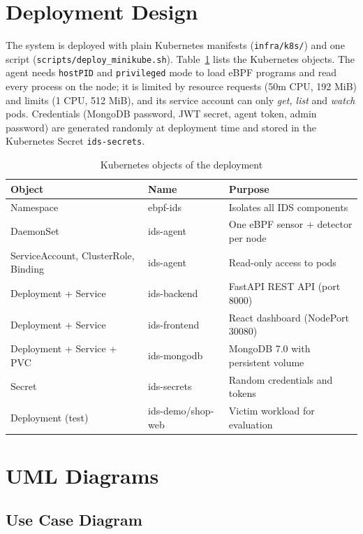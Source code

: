\section{Deployment Design}

The system is deployed with plain Kubernetes manifests (\texttt{infra/k8s/}) and one
script (\texttt{scripts/deploy\_minikube.sh}). Table~\ref{tab:k8sobjects} lists the
Kubernetes objects. The agent needs \texttt{hostPID} and \texttt{privileged} mode to load
eBPF programs and read every process on the node; it is limited by resource requests
(50m CPU, 192 MiB) and limits (1 CPU, 512 MiB), and its service account can only
\emph{get, list} and \emph{watch} pods. Credentials (MongoDB password, JWT secret, agent
token, admin password) are generated randomly at deployment time and stored in the
Kubernetes Secret \texttt{ids-secrets}.

\begin{table}[H]
\centering
\caption{Kubernetes objects of the deployment}
\label{tab:k8sobjects}
\small
\begin{tabularx}{\textwidth}{>{\raggedright\arraybackslash}p{4.4cm} l >{\raggedright\arraybackslash}X}
\toprule
\textbf{Object} & \textbf{Name} & \textbf{Purpose} \\
\midrule
Namespace & ebpf-ids & Isolates all IDS components \\
DaemonSet & ids-agent & One eBPF sensor + detector per node \\
ServiceAccount, ClusterRole, Binding & ids-agent & Read-only access to pods \\
Deployment + Service & ids-backend & FastAPI REST API (port 8000) \\
Deployment + Service & ids-frontend & React dashboard (NodePort 30080) \\
Deployment + Service + PVC & ids-mongodb & MongoDB 7.0 with persistent volume \\
Secret & ids-secrets & Random credentials and tokens \\
Deployment (test) & ids-demo/shop-web & Victim workload for evaluation \\
\bottomrule
\end{tabularx}
\end{table}

\section{UML Diagrams}

\subsection{Use Case Diagram}

